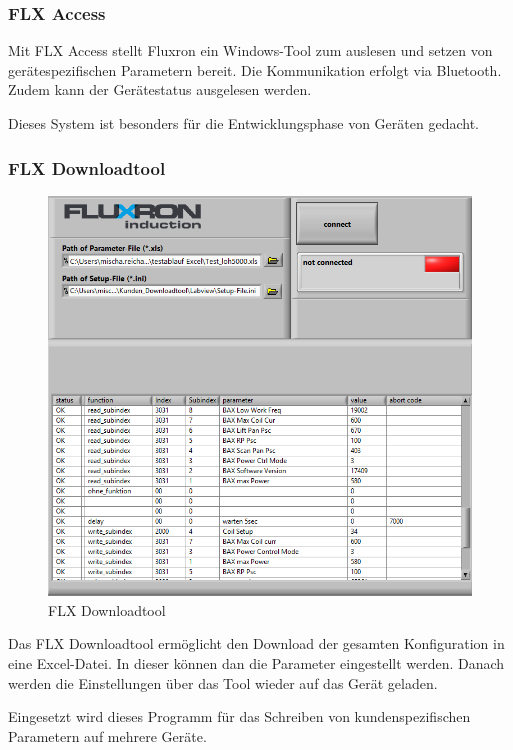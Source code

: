 \subsubsection{FLX Access}
\label{subsubsec:FLX Access}

Mit FLX Access stellt Fluxron ein Windows-Tool zum auslesen und setzen von gerätespezifischen Parametern bereit. Die Kommunikation erfolgt via Bluetooth. Zudem kann der Gerätestatus ausgelesen werden. 

Dieses System ist besonders für die Entwicklungsphase von Geräten gedacht.

\subsubsection{FLX Downloadtool}
\label{subsubsec:FLX Downloadtool}

\begin{figure}
	\includegraphics[scale=0.25]{analysis/res/flxdltool}
	\caption{FLX Downloadtool}
\end{figure}

Das FLX Downloadtool ermöglicht den Download der gesamten Konfiguration in eine Excel-Datei. In dieser können dan die Parameter eingestellt werden. Danach werden die Einstellungen über das Tool wieder auf das Gerät geladen.

Eingesetzt wird dieses Programm für das Schreiben von kundenspezifischen Parametern auf mehrere Geräte.
